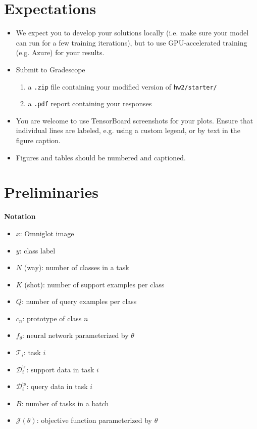 \documentclass[12pt]{article}
\newcommand{\task}{\mathcal{T}}
\newcommand{\supportdata}{\mathcal{D}^\mathrm{tr}}
\newcommand{\querydata}{\mathcal{D}^\mathrm{ts}}
\begin{document}
\section*{Expectations}
\begin{itemize}
    \item We expect you to develop your solutions locally (i.e. make sure your model can run for a few training iterations), but to use GPU-accelerated training (e.g. Azure) for your results.
    \item Submit to Gradescope
    \begin{enumerate}
        \item a \texttt{.zip} file containing your modified version of \texttt{hw2/starter/}
        \item a \texttt{.pdf} report containing your responses
    \end{enumerate}
    \item You are welcome to use TensorBoard screenshots for your plots. Ensure that individual lines are labeled, e.g. using a custom legend, or by text in the figure caption.
    \item Figures and tables should be numbered and captioned.
\end{itemize}


\newpage
\section*{Preliminaries}
\textbf{Notation}
\begin{itemize}
    \item $x$: Omniglot image
    \item $y$: class label
    \item $N$ (way): number of classes in a task
    \item $K$ (shot): number of support examples per class
    \item $Q$: number of query examples per class
    \item $c_n$: prototype of class $n$
    \item $f_\theta$: neural network parameterized by $\theta$
    \item $\task_i$: task $i$
    \item $\supportdata_i$: support data in task $i$
    \item $\querydata_i$: query data in task $i$
    \item $B$: number of tasks in a batch
    \item $\mathcal{J}(\theta)$: objective function parameterized by $\theta$
\end{itemize}
\end{document}
